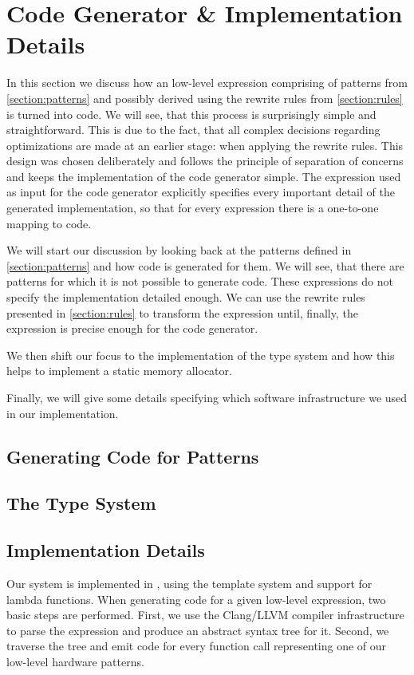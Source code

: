 
\section{Code Generator \& Implementation Details}
In this section we discuss how an low-level expression comprising of patterns from \autoref{section:patterns} and possibly derived using the rewrite rules from \autoref{section:rules} is turned into \OpenCL code.
We will see, that this process is surprisingly simple and straightforward.
This is due to the fact, that all complex decisions regarding optimizations are made at an earlier stage: when applying the rewrite rules.
This design was chosen deliberately and follows the principle of separation of concerns and keeps the implementation of the code generator simple.
The expression used as input for the code generator explicitly specifies every important detail of the generated \OpenCL implementation, so that for every expression there is a one-to-one mapping to \OpenCL code.

We will start our discussion by looking back at the patterns defined in \autoref{section:patterns} and how \OpenCL code is generated for them.
We will see, that there are patterns for which it is not possible to generate \OpenCL code.
These expressions do not specify the \OpenCL implementation detailed enough.
We can use the rewrite rules presented in \autoref{section:rules} to transform the expression until, finally, the expression is precise enough for the code generator.

We then shift our focus to the implementation of the type system and how this helps to implement a static memory allocator.

Finally, we will give some details specifying which software infrastructure we used in our implementation.

\subsection{Generating \OpenCL Code for Patterns}

\subsection{The Type System}

\subsection{Implementation Details}
Our system is implemented in \Cpp, using the template system and support for lambda functions. 
When generating code for a given low-level expression, two basic steps are performed.
First, we use the Clang/LLVM compiler infrastructure to parse the expression and produce an abstract syntax tree for it.
Second, we traverse the tree and emit code for every function call representing one of our low-level hardware patterns.

